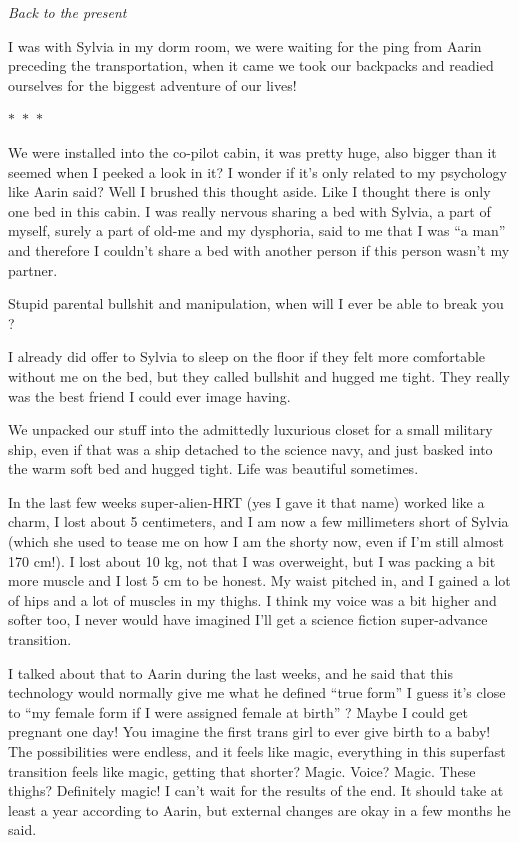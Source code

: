 \documentclass[colorlinks,12pt,a4paper]{book}
\newcommand\sep{\begin{center}
  \boldmath $\ast$~$\ast$~$\ast$
\end{center}}
\begin{document}
\textit{Back to the present}\par
\bigskip

I was with Sylvia in my dorm room, we were waiting for the ping from Aarin preceding the transportation, when 
it came we took our backpacks and readied ourselves for the biggest adventure of our lives!

\sep

We were installed into the co-pilot cabin, it was pretty huge, also bigger than it seemed when I peeked a 
look in it? I wonder if it's only related to my psychology like Aarin said? Well I brushed this thought aside. 
Like I thought there is only one bed in this cabin. I was really nervous sharing a bed with Sylvia, a part 
of myself, surely a part of old-me and my dysphoria, said to me that I was “a man” and therefore I couldn't share
 a bed with another person if this person wasn't my partner. \par
 \bigskip

Stupid parental bullshit and manipulation, when will I ever be able to break you ? \par
\bigskip
I already did offer to Sylvia to sleep on the floor if they felt more comfortable without me on the bed, but 
they called bullshit and hugged me tight. They really was the best friend I could ever image having. \par
\bigskip

We unpacked our stuff into the admittedly luxurious closet for a small military ship, even if that was a ship 
detached to the science navy, and just basked into the warm soft bed and hugged tight. Life was beautiful sometimes. \par
\bigskip

In the last few weeks super-alien-HRT (yes I gave it that name) worked like a charm, I lost about 5 centimeters, 
and I am now a few millimeters short of Sylvia (which she used to tease me on how I am the shorty now, 
even if I'm still almost 170 cm!). I lost about 10 kg, not that I was overweight, but I was packing a bit 
more muscle and I lost 5 cm to be honest. My waist pitched in, and I gained a lot of hips and a lot of muscles in my thighs. 
I think my voice was a bit higher and softer too, I never would have imagined I'll get a science fiction super-advance
 transition. \par
 \bigskip

I talked about that to Aarin during the last weeks, and he said that this technology would normally give me what he 
defined “true form” I guess it's close to “my female form if I were assigned female at birth” ? Maybe I could get 
pregnant one day! You imagine the first trans girl to ever give birth to a baby! The possibilities were endless, 
and it feels like magic, everything in this superfast transition feels like magic, getting that shorter? 
Magic. Voice? Magic. These thighs? Definitely magic! I can't wait for the results of the end. 
It should take at least a year according to Aarin, but external changes are okay in a few months he said.\par
\bigskip
\end{document}
